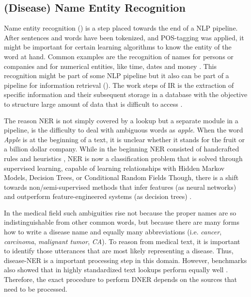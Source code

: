 \subsection{(Disease) Name Entity Recognition}
Name entity recognition () is a step placed towards the end of a NLP pipeline. After sentences and words have been tokenized, and POS-tagging was applied, it might be important for certain learning algorithms to
know the entity of the word at hand. Common examples are the recognition of names for persons or companies and for numerical entities, like time, dates and money \citep{Nadeau2009}. This recognition might be part of some NLP pipeline but it also can be part of a pipeline for information retrieval (). The work steps of IR is the extraction of specific information and their subsequent storage in a database with the objective to structure large amount of data that is difficult to access \citep{Manning2008, Wei2011}.

The reason NER is not simply covered by a lookup but a separate module in a pipeline, is the difficulty to deal with ambiguous words as \textit{apple}. When the word \textit{Apple} is at the beginning of a text, it is unclear whether it stands for the fruit or a billion dollar company. While in the beginning NER consisted of handcrafted rules and heuristics \citep{Rau1991}, NER is now a classification problem that is solved through supervised learning, capable of learning relationships with Hidden Markov Models, Decision Trees, or Conditional Random Fields \citep{Nadeau2009} Though, there is a shift towards non/semi-supervised methods that infer features (as neural networks) and outperform feature-engineered systems (as decision trees) \citep{Yadav2018}.

In the medical field such ambiguities rise not because the proper names are so indistinguishable from other common words, but because there are many forms how to write a disease name and equally many abbreviations (i.e. \textit{cancer}, \textit{carcinoma}, \textit{malignant tumor}, \textit{CA}). To reason from medical text, it is important to identify those utterances that are most likely representing a disease. Thus, disease-NER is a important processing step in this domain. However, benchmarks also showed that in highly standardized text lookups perform equally well \citep{Jimeno2007}. Therefore, the exact procedure to perform DNER depends on the sources that need to be processed.

